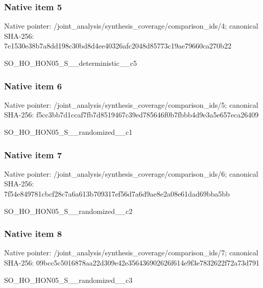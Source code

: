 \documentclass[10pt,a4paper]{article}
\begin{document}
\subsubsection{Native item 5}
Native pointer: /joint\_\allowbreak{}analysis/synthesis\_\allowbreak{}coverage/comparison\_\allowbreak{}ids/4; canonical SHA-256: 7e1530e38b7a8dd198c30bd8d4ee40326afc2048d85773c19ae79660ca270b22

\begingroup\raggedright\sloppy SO\_\allowbreak{}HO\_\allowbreak{}HON05\_\allowbreak{}S\_\allowbreak{}\_\allowbreak{}deterministic\_\allowbreak{}\_\allowbreak{}c5\par\endgroup

\subsubsection{Native item 6}
Native pointer: /joint\_\allowbreak{}analysis/synthesis\_\allowbreak{}coverage/comparison\_\allowbreak{}ids/5; canonical SHA-256: f5cc3bb7d1ccaf7fb7d8519467c39ed785646f0b7fbbb4d9e3a5e657eca26409

\begingroup\raggedright\sloppy SO\_\allowbreak{}HO\_\allowbreak{}HON05\_\allowbreak{}S\_\allowbreak{}\_\allowbreak{}randomized\_\allowbreak{}\_\allowbreak{}c1\par\endgroup

\subsubsection{Native item 7}
Native pointer: /joint\_\allowbreak{}analysis/synthesis\_\allowbreak{}coverage/comparison\_\allowbreak{}ids/6; canonical SHA-256: 7f54e849781cbcf28c7a6a613b709317ef56d7a6d9ae8e2a08e61dad69bba5bb

\begingroup\raggedright\sloppy SO\_\allowbreak{}HO\_\allowbreak{}HON05\_\allowbreak{}S\_\allowbreak{}\_\allowbreak{}randomized\_\allowbreak{}\_\allowbreak{}c2\par\endgroup

\subsubsection{Native item 8}
Native pointer: /joint\_\allowbreak{}analysis/synthesis\_\allowbreak{}coverage/comparison\_\allowbreak{}ids/7; canonical SHA-256: 09bcc5c5016878aa22d309e42e356436902626f614e9f3e7832622f72a73d791

\begingroup\raggedright\sloppy SO\_\allowbreak{}HO\_\allowbreak{}HON05\_\allowbreak{}S\_\allowbreak{}\_\allowbreak{}randomized\_\allowbreak{}\_\allowbreak{}c3\par\endgroup
\end{document}
